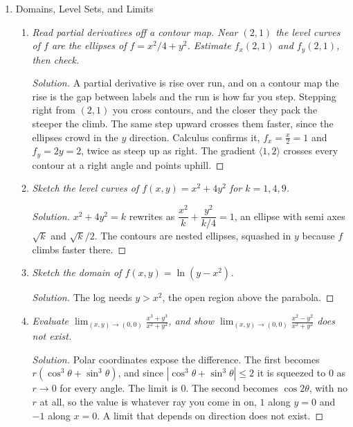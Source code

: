 \documentclass[12pt]{article}
\newenvironment{solution}
  {\renewcommand\qedsymbol{$\blacksquare$}\begin{proof}[Solution]}
  {\end{proof}}
\begin{document}
\begin{enumerate}
\begin{enumerate}
    \end{enumerate}
\newpage

\item Domains, Level Sets, and Limits

    \begin{enumerate}
    \item \textit{Read partial derivatives off a contour map. Near $(2,1)$ the level curves of $f$ are the ellipses of $f=x^2/4+y^2$. Estimate $f_x(2,1)$ and $f_y(2,1)$, then check.}

    \begin{solution}
    A partial derivative is rise over run, and on a contour map the rise is the gap between labels and the run is how far you step. Stepping right from $(2,1)$ you cross contours, and the closer they pack the steeper the climb. The same step upward crosses them faster, since the ellipses crowd in the $y$ direction. Calculus confirms it, $f_x=\tfrac{x}{2}=1$ and $f_y=2y=2$, twice as steep up as right. The gradient $\langle1,2\rangle$ crosses every contour at a right angle and points uphill.
    \end{solution}

    \item \textit{Sketch the level curves of $f(x,y)=x^2+4y^2$ for $k=1,4,9$.}

    \begin{solution}
    $x^2+4y^2=k$ rewrites as $\dfrac{x^2}{k}+\dfrac{y^2}{k/4}=1$, an ellipse with semi axes $\sqrt k$ and $\sqrt k/2$. The contours are nested ellipses, squashed in $y$ because $f$ climbs faster there.
    \end{solution}

    \item \textit{Sketch the domain of $f(x,y)=\ln(y-x^2)$.}

    \begin{solution}
    The log needs $y>x^2$, the open region above the parabola.
    \end{solution}

    \item \textit{Evaluate $\displaystyle\lim_{(x,y)\to(0,0)}\frac{x^3+y^3}{x^2+y^2}$, and show $\displaystyle\lim_{(x,y)\to(0,0)}\frac{x^2-y^2}{x^2+y^2}$ does not exist.}

    \begin{solution}
    Polar coordinates expose the difference. The first becomes $r(\cos^3\theta+\sin^3\theta)$, and since $|\cos^3\theta+\sin^3\theta|\le2$ it is squeezed to $0$ as $r\to0$ for every angle. The limit is $0$. The second becomes $\cos2\theta$, with no $r$ at all, so the value is whatever ray you come in on, $1$ along $y=0$ and $-1$ along $x=0$. A limit that depends on direction does not exist.
    \end{solution}


\end{enumerate}
\end{enumerate}
\end{document}
